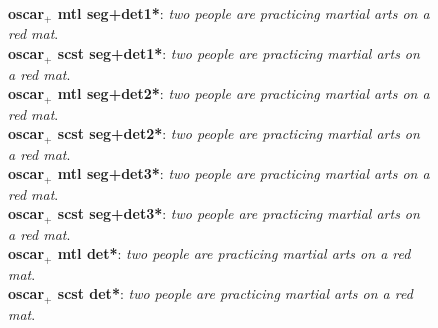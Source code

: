 \begin{figure}[H]
{        \textbf{\acrshort{oscar}$_+$ \acrshort{mtl} seg+det1*}: \textit{two people are practicing martial arts on a red mat}.\\
        \textbf{\acrshort{oscar}$_+$ \acrshort{scst} seg+det1*}: \textit{two people are practicing martial arts on a red mat}.\\
        \textbf{\acrshort{oscar}$_+$ \acrshort{mtl} seg+det2*}: \textit{two people are practicing martial arts on a red mat}.\\
        \textbf{\acrshort{oscar}$_+$ \acrshort{scst} seg+det2*}: \textit{two people are practicing martial arts on a red mat}.\\
        \textbf{\acrshort{oscar}$_+$ \acrshort{mtl} seg+det3*}: \textit{two people are practicing martial arts on a red mat}.\\
        \textbf{\acrshort{oscar}$_+$ \acrshort{scst} seg+det3*}: \textit{two people are practicing martial arts on a red mat}.\\
        \textbf{\acrshort{oscar}$_+$ \acrshort{mtl} det*}: \textit{two people are practicing martial arts on a red mat}.\\
        \textbf{\acrshort{oscar}$_+$ \acrshort{scst} det*}: \textit{two people are practicing martial arts on a red mat}.
        }
        \label{fig:test2}
\end{figure}


